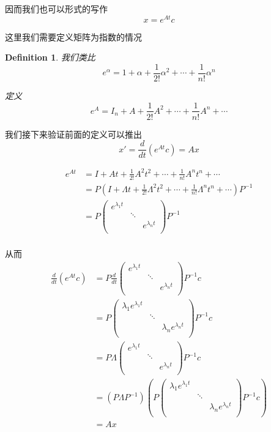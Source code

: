 \documentclass[11pt,hyperref,a4paper,UTF8]{ctexart}
\newtheorem{definition}{Definition}[subsection]
\newcommand{\parameter}[1]{\left(#1\right)}
\begin{document}
\begin{CJK}{UTF8}{gkai}
因而我们也可以形式的写作
\[x = e^{At} c\]

这里我们需要定义矩阵为指数的情况

\begin{definition}
  我们类比
  \[e^\alpha = 1 + \alpha + \frac{1}{2!} \alpha^2 + \cdots + \frac{1}{n !} \alpha^n\]

  定义
  \[e^A = I_{n} + A + \frac{1}{2!}A^2 + \cdots + \frac{1}{n!}A^n + \cdots\]
\end{definition}

我们接下来验证前面的定义可以推出
\[x' = \frac{d}{dt}\parameter{e^{At} c} = Ax\]

\[
\begin{aligned}
  e^{At} &= I + At + \frac{1}{2!} A^2 t^2 + \cdots + \frac{1}{n!} A^n t^n + \cdots\\
  &= P(I + \varLambda t + \frac{1}{2!}\varLambda^2 t^2 + \cdots + \frac{1}{n!} \varLambda^n t^n + \cdots) P^{-1}\\
  &= P \begin{pmatrix}
    e^{\lambda_1 t}&&\\
    &\ddots&\\
    &&e^{\lambda_n t}\\
  \end{pmatrix} P^{-1}\\
\end{aligned}  
\]

从而
\[
\begin{aligned}
  \frac{d}{dt}\parameter{e^{At} c} &= P \frac{d}{dt}\begin{pmatrix}
    e^{\lambda_1 t}&&\\
    &\ddots&\\
    &&e^{\lambda_n t}\\
  \end{pmatrix} P^{-1}c\\
  &= P\begin{pmatrix}
    \lambda_1 e^{\lambda_1 t}&&\\
    &\ddots&\\
    &&\lambda_n e^{\lambda_n t}\\
  \end{pmatrix} P^{-1}c\\
  &= P \varLambda \begin{pmatrix}
    e^{\lambda_1 t}&&\\
    &\ddots&\\
    &&e^{\lambda_n t}\\
  \end{pmatrix} P^{-1}c\\
  &= \parameter{P \varLambda P^{-1}}\parameter{P\begin{pmatrix}
    \lambda_1 e^{\lambda_1 t}&&\\
    &\ddots&\\
    &&\lambda_n e^{\lambda_n t}\\
  \end{pmatrix} P^{-1}c}\\
  &=Ax\\
\end{aligned}  
\]


\end{CJK}
\end{document}
